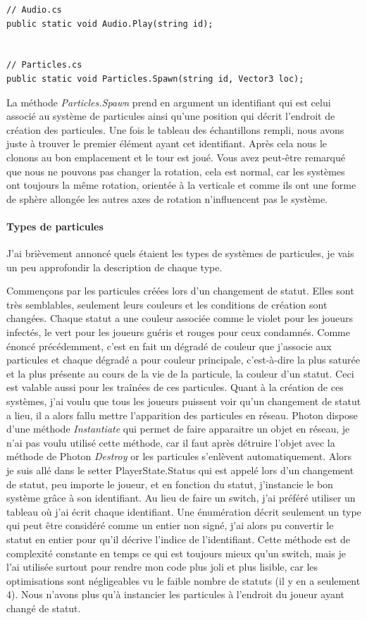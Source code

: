 \documentclass{article}
\begin{document}
\begin{lstlisting}
// Audio.cs
public static void Audio.Play(string id);


// Particles.cs
public static void Particles.Spawn(string id, Vector3 loc);
\end{lstlisting}


La méthode \emph{Particles.Spawn} prend en argument un identifiant qui est celui associé au système de particules ainsi qu'une position qui décrit l'endroit de création des particules. Une fois le tableau des échantillons rempli, nous avons juste à trouver le premier élément ayant cet identifiant. Après cela nous le clonons au bon emplacement et le tour est joué. Vous avez peut-être remarqué que nous ne pouvons pas changer la rotation, cela est normal, car les systèmes ont toujours la même rotation, orientée à la verticale et comme ils ont une forme de sphère allongée les autres axes de rotation n'influencent pas le système.


\paragraph{Types de particules}


J'ai brièvement annoncé quels étaient les types de systèmes de particules, je vais un peu approfondir la description de chaque type.


Commençons par les particules créées lors d'un changement de statut. Elles sont très semblables, seulement leurs couleurs et les conditions de création sont changées. Chaque statut a une couleur associée comme le violet pour les joueurs infectés, le vert pour les joueurs guéris et rouges pour ceux condamnés. Comme énoncé précédemment, c'est en fait un dégradé de couleur que j'associe aux particules et chaque dégradé a pour couleur principale, c'est-à-dire la plus saturée et la plus présente au cours de la vie de la particule, la couleur d'un statut. Ceci est valable aussi pour les traînées de ces particules. Quant à la création de ces systèmes, j'ai voulu que tous les joueurs puissent voir qu'un changement de statut a lieu, il a alors fallu mettre l'apparition des particules en réseau. Photon dispose d'une méthode \emph{Instantiate} qui permet de faire apparaitre un objet en réseau, je n'ai pas voulu utilisé cette méthode, car il faut après détruire l'objet avec la méthode de Photon \emph{Destroy} or les particules s'enlèvent automatiquement. Alors je suis allé dans le setter PlayerState.Status qui est appelé lors d'un changement de statut, peu importe le joueur, et en fonction du statut, j'instancie le bon système grâce à son identifiant. Au lieu de faire un switch, j'ai préféré utiliser un tableau où j'ai écrit chaque identifiant. Une énumération décrit seulement un type qui peut être considéré comme un entier non signé, j'ai alors pu convertir le statut en entier pour qu'il décrive l'indice de l'identifiant. Cette méthode est de complexité constante en temps ce qui est toujours mieux qu'un switch, mais je l'ai utilisée surtout pour rendre mon code plus joli et plus lisible, car les optimisations sont négligeables vu le faible nombre de statuts (il y en a seulement 4). Nous n'avons plus qu'à instancier les particules à l'endroit du joueur ayant changé de statut.
\end{document}
